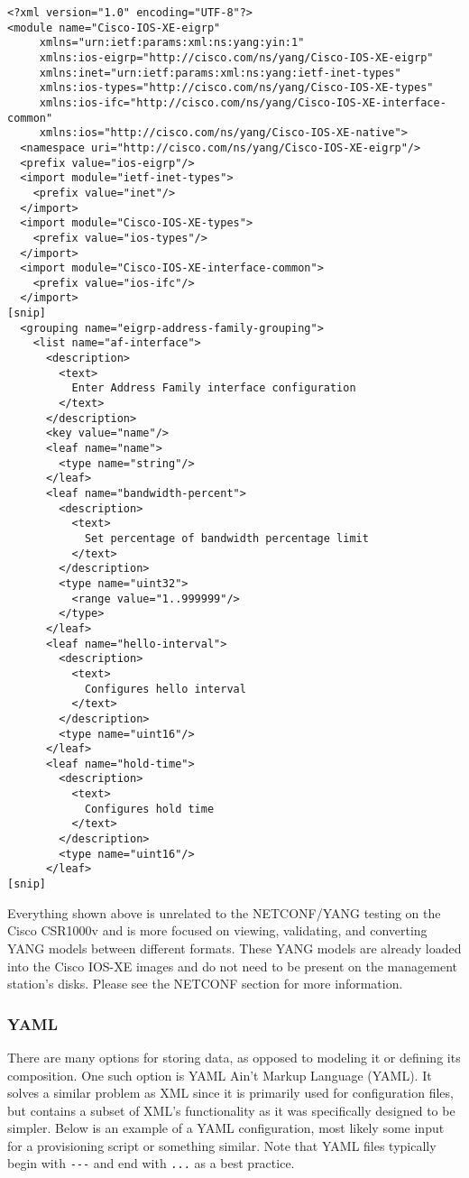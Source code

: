 \begin{verbatim}
<?xml version="1.0" encoding="UTF-8"?>
<module name="Cisco-IOS-XE-eigrp"
     xmlns="urn:ietf:params:xml:ns:yang:yin:1"
     xmlns:ios-eigrp="http://cisco.com/ns/yang/Cisco-IOS-XE-eigrp"
     xmlns:inet="urn:ietf:params:xml:ns:yang:ietf-inet-types"
     xmlns:ios-types="http://cisco.com/ns/yang/Cisco-IOS-XE-types"
     xmlns:ios-ifc="http://cisco.com/ns/yang/Cisco-IOS-XE-interface-common"
     xmlns:ios="http://cisco.com/ns/yang/Cisco-IOS-XE-native">
  <namespace uri="http://cisco.com/ns/yang/Cisco-IOS-XE-eigrp"/>
  <prefix value="ios-eigrp"/>
  <import module="ietf-inet-types">
    <prefix value="inet"/>
  </import>
  <import module="Cisco-IOS-XE-types">
    <prefix value="ios-types"/>
  </import>
  <import module="Cisco-IOS-XE-interface-common">
    <prefix value="ios-ifc"/>
  </import>
[snip]
  <grouping name="eigrp-address-family-grouping">
    <list name="af-interface">
      <description>
        <text>
          Enter Address Family interface configuration
        </text>
      </description>
      <key value="name"/>
      <leaf name="name">
        <type name="string"/>
      </leaf>
      <leaf name="bandwidth-percent">
        <description>
          <text>
            Set percentage of bandwidth percentage limit
          </text>
        </description>
        <type name="uint32">
          <range value="1..999999"/>
        </type>
      </leaf>
      <leaf name="hello-interval">
        <description>
          <text>
            Configures hello interval
          </text>
        </description>
        <type name="uint16"/>
      </leaf>
      <leaf name="hold-time">
        <description>
          <text>
            Configures hold time
          </text>
        </description>
        <type name="uint16"/>
      </leaf>   
[snip]
\end{verbatim}

Everything shown above is unrelated to the NETCONF/YANG testing on the Cisco
CSR1000v and is more focused on viewing, validating, and converting YANG
models between different formats. These YANG models are already loaded into
the Cisco IOS-XE images and do not need to be present on the management
station's disks. Please see the NETCONF section for more information.

\subsubsection{YAML}
There are many options for storing data, as opposed to modeling it or defining
its composition. One such option is YAML Ain’t Markup Language (YAML). It
solves a similar problem as XML since it is primarily used for configuration
files, but contains a subset of XML's functionality as it was specifically
designed to be simpler. Below is an example of a YAML configuration, most
likely some input for a provisioning script or something similar. Note that
YAML files typically begin with \verb|---| and end with \verb|...| as a best practice.

